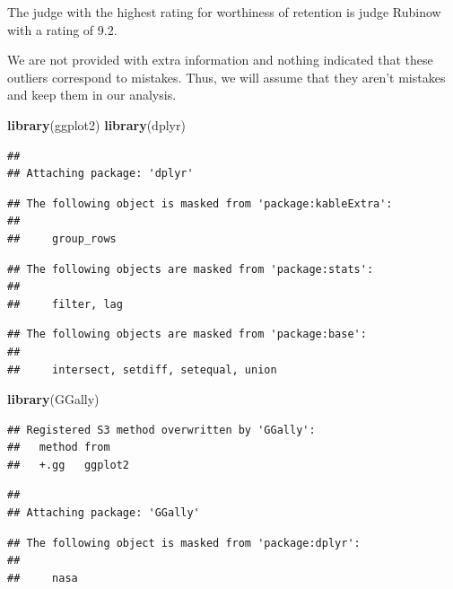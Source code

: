 \documentclass[]{article}
\newenvironment{Shaded}{\begin{snugshade}}{\end{snugshade}}
\newcommand{\KeywordTok}[1]{\textcolor[rgb]{0.13,0.29,0.53}{\textbf{#1}}}
\newcommand{\NormalTok}[1]{#1}
\begin{document}
The judge with the highest rating for worthiness of retention is judge
Rubinow with a rating of 9.2.

We are not provided with extra information and nothing indicated that
these outliers correspond to mistakes. Thus, we will assume that they
aren't mistakes and keep them in our analysis.

\begin{Shaded}
\begin{Highlighting}[]
\KeywordTok{library}\NormalTok{(ggplot2)}
\KeywordTok{library}\NormalTok{(dplyr)}
\end{Highlighting}
\end{Shaded}

\begin{verbatim}
## 
## Attaching package: 'dplyr'
\end{verbatim}

\begin{verbatim}
## The following object is masked from 'package:kableExtra':
## 
##     group_rows
\end{verbatim}

\begin{verbatim}
## The following objects are masked from 'package:stats':
## 
##     filter, lag
\end{verbatim}

\begin{verbatim}
## The following objects are masked from 'package:base':
## 
##     intersect, setdiff, setequal, union
\end{verbatim}

\begin{Shaded}
\begin{Highlighting}[]
\KeywordTok{library}\NormalTok{(GGally)}
\end{Highlighting}
\end{Shaded}

\begin{verbatim}
## Registered S3 method overwritten by 'GGally':
##   method from   
##   +.gg   ggplot2
\end{verbatim}

\begin{verbatim}
## 
## Attaching package: 'GGally'
\end{verbatim}

\begin{verbatim}
## The following object is masked from 'package:dplyr':
## 
##     nasa
\end{verbatim}
\end{document}
